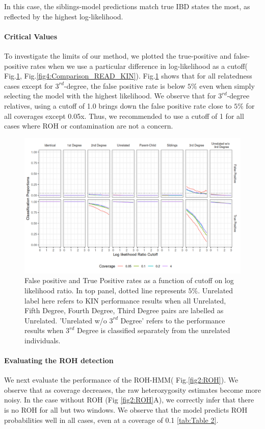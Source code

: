 \documentclass[12pt, letterpaper]{article}
\begin{document}
In this case, the siblings-model predictions match true IBD states the most, as reflected by the highest log-likelihood. 


\paragraph{Critical Values}
 To investigate the limits of our method, we plotted the true-positive and false-positive rates when we use a particular difference in log-likelihood as a cutoff( Fig.\ref{fig3:cutoff},  Fig.\ref{fig4:Comparison_READ_KIN}).   Fig.\ref{fig3:cutoff} shows that for all relatedness cases except for $3^{rd}$-degree, the false positive rate is below $5\%$ even when simply selecting the model with the highest likelihood. We observe that for $3^{rd}$-degree relatives, using a cutoff of 1.0 brings down the false positive rate close to $5\%$ for all coverages except 0.05x. Thus, we  recommended to use a cutoff of 1 for all cases where ROH or contamination are not a concern.

\begin{figure}[h!]
    \includegraphics[width=16cm]{plots/plotimg/contam0_inbred0_model_performance_allroc_asc0_plot.png}
    \centering
    \caption{False positive and True Positive rates as a function of cutoff on log likelihood ratio. In top panel, dotted line represents $5\%$. Unrelated label here refers to KIN performance results when all Unrelated, Fifth Degree, Fourth Degree, Third Degree pairs are labelled as Unrelated. 'Unrelated w/o $3^{rd}$ Degree' refers to the performance results when $3^{rd}$ Degree is classified separately from the unrelated individuals.}
    \label{fig3:cutoff}
\end{figure}

\paragraph{Evaluating the ROH detection}
We next evaluate the performance of the ROH-HMM( Fig.\ref{fig2:ROH}). We observe that as coverage decreases, the raw heterozygosity estimates become more noisy. In the case without ROH (Fig \ref{fig2:ROH}A), we correctly infer that there is no ROH for all but two windows. We observe that the model predicts ROH probabilities well in all cases, even at a coverage of 0.1 \ref{tab:Table 2}. 
\end{document}
